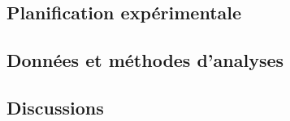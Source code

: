 \subsection{Planification expérimentale}

\subsection{Données et méthodes d'analyses}

\subsection{Discussions}




